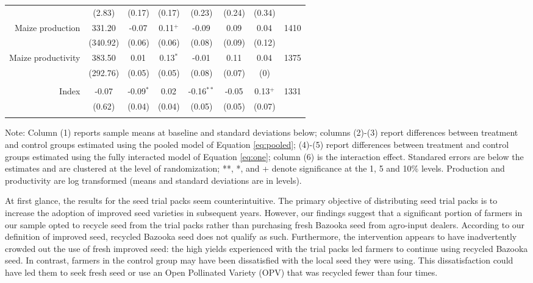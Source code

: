 \documentclass[english]{article}\usepackage[]{graphicx}\usepackage[]{xcolor}
\begin{document}
\begin{sidewaystable}
\begin{center}
\begin{tabular}{rccccccc}
& (2.83) & (0.17)  & (0.17) & (0.23)  & (0.24)  & (0.34)
 \\

Maize production
& 331.20
& -0.07$^{}$
& 0.11$^{+}$ 
& -0.09$^{}$ 
& 0.09$^{}$
& 0.04$^{}$ & 1410 \\

& (340.92) & (0.06)  & (0.06) & (0.08)  & (0.09)  & (0.12)
 \\

Maize productivity
& 383.50
& 0.01$^{}$
& 0.13$^{*}$ 
& -0.01$^{}$ 
& 0.11$^{}$
& 0.04$^{}$ & 1375 \\

& (292.76) & (0.05)  & (0.05) & (0.08)  & (0.07)  & (0)
 \\

\\
Index
& -0.07
& -0.09$^{*}$
& 0.02$^{}$ 
& -0.16$^{**}$ 
& -0.05$^{}$
& 0.13$^{+}$ & 1331 \\

& (0.62) & (0.04)  & (0.04) & (0.05)  & (0.05)  & (0.07)
 \\
\\
\hline\hline
\end{tabular}
\end{center}
\scriptsize
Note: Column (1) reports sample means at baseline and standard deviations below;  columns (2)-(3) report differences between treatment and control groups estimated using the pooled model of Equation  \ref{eq:pooled}; (4)-(5) report differences between treatment and control groups estimated using the fully interacted model of Equation \ref{eq:one}; column (6) is the interaction effect. Standared errors are below the estimates and are clustered at the level of randomization; **, *, and + denote significance at the 1, 5 and 10\% levels. Production and productivity are log transformed (means and standard deviations are in levels).
\end{sidewaystable}

At first glance, the results for the seed trial packs seem counterintuitive.
The primary objective of distributing seed trial packs is to increase
the adoption of improved seed varieties in subsequent years. However,
our findings suggest that a significant portion of farmers in our
sample opted to recycle seed from the trial packs rather than purchasing
fresh Bazooka seed from agro-input dealers. According to our definition
of improved seed, recycled Bazooka seed does not qualify as such.
Furthermore, the intervention appears to have inadvertently crowded
out the use of fresh improved seed: the high yields experienced with
the trial packs led farmers to continue using recycled Bazooka seed.
In contrast, farmers in the control group may have been dissatisfied
with the local seed they were using. This dissatisfaction could have
led them to seek fresh seed or use an Open Pollinated Variety (OPV)
that was recycled fewer than four times.
\end{document}
